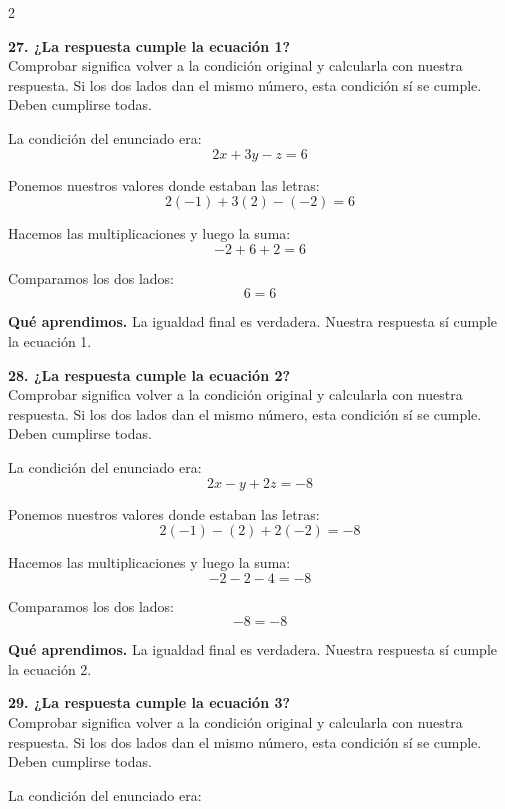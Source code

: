 \documentclass[11pt,a4paper,landscape]{article}
\begin{document}
\begin{multicols*}{2}
\noindent\begin{minipage}{\linewidth}\textbf{27. ¿La respuesta cumple la ecuación 1?}\\[2pt]Comprobar significa volver a la condición original y calcularla con nuestra respuesta. Si los dos lados dan el mismo número, esta condición sí se cumple. Deben cumplirse todas.
\par\smallskip La condición del enunciado era:
\[2x + 3y - z = 6\]
\par\smallskip Ponemos nuestros valores donde estaban las letras:
\[2\left(-1\right) + 3\left(2\right) - \left(-2\right)=6\]
\par\smallskip Hacemos las multiplicaciones y luego la suma:
\[-2 + 6 + 2=6\]
\par\smallskip Comparamos los dos lados:
\[6=6\]
\par\smallskip\textbf{Qué aprendimos.} La igualdad final es verdadera. Nuestra respuesta sí cumple la ecuación 1.
\end{minipage}\par\medskip
\noindent\begin{minipage}{\linewidth}\textbf{28. ¿La respuesta cumple la ecuación 2?}\\[2pt]Comprobar significa volver a la condición original y calcularla con nuestra respuesta. Si los dos lados dan el mismo número, esta condición sí se cumple. Deben cumplirse todas.
\par\smallskip La condición del enunciado era:
\[2x - y + 2z = -8\]
\par\smallskip Ponemos nuestros valores donde estaban las letras:
\[2\left(-1\right) - \left(2\right) + 2\left(-2\right)=-8\]
\par\smallskip Hacemos las multiplicaciones y luego la suma:
\[-2 - 2 - 4=-8\]
\par\smallskip Comparamos los dos lados:
\[-8=-8\]
\par\smallskip\textbf{Qué aprendimos.} La igualdad final es verdadera. Nuestra respuesta sí cumple la ecuación 2.
\end{minipage}\par\medskip
\noindent\begin{minipage}{\linewidth}\textbf{29. ¿La respuesta cumple la ecuación 3?}\\[2pt]Comprobar significa volver a la condición original y calcularla con nuestra respuesta. Si los dos lados dan el mismo número, esta condición sí se cumple. Deben cumplirse todas.
\par\smallskip La condición del enunciado era:

\end{minipage}
\end{multicols*}
\end{document}
